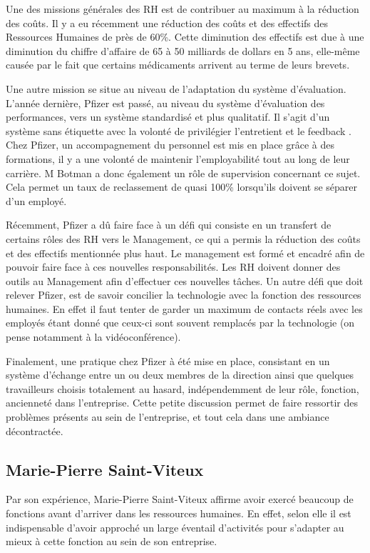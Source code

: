 \documentclass[a4paper, 12pt]{article}
\begin{document}
Une des missions générales des RH est de contribuer au maximum à la réduction des coûts. Il y a eu récemment une réduction des coûts et des effectifs des Ressources Humaines de près de 60\%. Cette diminution des effectifs est due à une diminution du chiffre d'affaire de 65 à 50 milliards de dollars en 5 ans, elle-même causée par le fait que certains médicaments arrivent au terme de leurs brevets.

 Une autre mission se situe au niveau de l'adaptation du système d'évaluation. L'année dernière, Pfizer est passé, au niveau du système d'évaluation des performances, vers un système standardisé et plus qualitatif. Il s'agit d'un système sans étiquette avec la volonté de privilégier l'entretient et le feedback . Chez Pfizer, un accompagnement du personnel est mis en place grâce à des formations, il y a une volonté de maintenir l'employabilité tout au long de leur carrière. M Botman a donc également un rôle de supervision concernant ce sujet. Cela permet un taux de reclassement de quasi 100\% lorsqu'ils doivent se séparer d'un employé.

Récemment, Pfizer a dû faire face à un défi qui consiste en un transfert de certains rôles des RH vers le Management, ce qui a permis la réduction des coûts et des effectifs mentionnée plus haut. Le management est formé et encadré afin de pouvoir faire face à ces nouvelles responsabilités. Les RH doivent donner des outils au Management afin d'effectuer ces nouvelles tâches.
Un autre défi que doit relever Pfizer, est de savoir concilier la technologie avec la fonction des ressources humaines. En effet il faut tenter de garder un maximum de contacts réels avec les employés étant donné que ceux-ci sont souvent remplacés par la technologie (on pense notamment à la vidéoconférence).

Finalement, une pratique chez Pfizer à été mise en place, consistant en un système d'échange entre un ou deux membres de la direction ainsi que quelques travailleurs choisis totalement au hasard, indépendemment de leur rôle, fonction, ancienneté dans l'entreprise. Cette petite discussion permet de faire ressortir des problèmes présents au sein de l'entreprise, et tout cela dans une ambiance décontractée.


\subsection{Marie-Pierre Saint-Viteux}

Par son expérience, Marie-Pierre Saint-Viteux affirme avoir exercé beaucoup de fonctions avant d'arriver dans les ressources humaines. En effet, selon elle il est indispensable d'avoir approché un large éventail d'activités pour s'adapter au mieux à cette fonction au sein de son entreprise.
\end{document}

